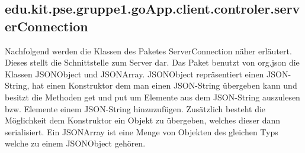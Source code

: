\hypertarget{ServerConnection}{}
	\subsection{edu.kit.pse.gruppe1.goApp.client.controler.serverConnection}
	 	Nachfolgend werden die Klassen des Paketes ServerConnection näher erläutert.
 	Dieses stellt die Schnittstelle zum Server dar. Das Paket benutzt von org.json die Klassen JSONObject und JSONArray.
 	JSONObject repräsentiert einen JSON-String, hat einen Konstruktor dem man einen JSON-String übergeben kann und besitzt die Methoden get und put um Elemente aus dem JSON-String auszulesen bzw. Elemente einem JSON-String hinzuzufügen.
 	Zusätzlich besteht die Möglichkeit dem Konstruktor ein Objekt zu übergeben, welches dieser dann serialisiert.
 	Ein JSONArray ist eine Menge von Objekten des gleichen Typs welche zu einem JSONObject gehören.
 	
